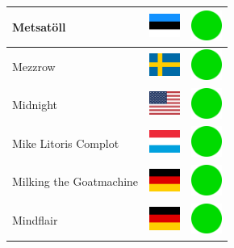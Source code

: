 \documentclass[12pt, a4paper, twoside]{report}
\begin{document}
\begin{center}
\begin{longtable}{|p{5cm}|p{2cm}|p{2cm}|}
 Metsatöll                                                  & \includegraphics[width=1cm]{../4x3/ee} &   \includegraphics[width=1cm]{../likes/y} \\ \hline
 Mezzrow                                                    & \includegraphics[width=1cm]{../4x3/se} &   \includegraphics[width=1cm]{../likes/y} \\ \hline
 Midnight                                                   & \includegraphics[width=1cm]{../4x3/us} &   \includegraphics[width=1cm]{../likes/y} \\ \hline
 Mike Litoris Complot                                       & \includegraphics[width=1cm]{../4x3/lu} &   \includegraphics[width=1cm]{../likes/y} \\ \hline
 Milking the Goatmachine                                    & \includegraphics[width=1cm]{../4x3/de} &   \includegraphics[width=1cm]{../likes/y} \\ \hline
 Mindflair                                                  & \includegraphics[width=1cm]{../4x3/de} &   \includegraphics[width=1cm]{../likes/y} \\ \hline

\end{longtable}
\end{center}
\end{document}
